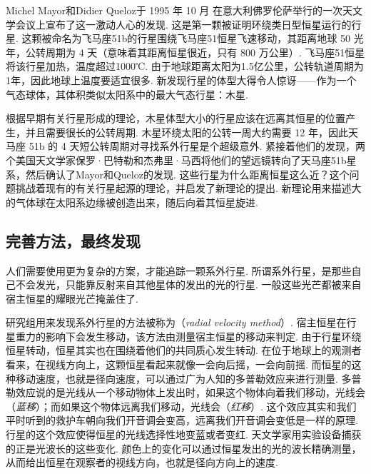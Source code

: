 \begin{multicols}{2}

Michel Mayor和Didier Queloz于 1995 年 10 月 在意大利佛罗伦萨举行的一次天文学会议上宣布了这一激动人心的发现. 这是第一颗被证明环绕类日型恒星运行的行星. 这颗被命名为飞马座51b的行星围绕飞马座51恒星飞速移动，其距离地球 50 光年，公转周期为 4 天（意味着其距离恒星很近，只有 800 万公里）. 飞马座51恒星将该行星加热，温度超过1000℃. 由于地球距离太阳为1.5亿公里，公转轨道周期为1年，因此地球上温度要适宜很多. 新发现行星的体型大得令人惊讶——作为一个气态球体，其体积类似太阳系中的最大气态行星：木星. 

根据早期有关行星形成的理论，木星体型大小的行星应该在远离其恒星的位置产生，并且需要很长的公转周期. 木星环绕太阳的公转一周大约需要 12 年，因此天马座 51b 的 4 天短公转周期对寻找系外行星是个超级意外. 紧接着他们的发现，两个美国天文学家保罗·巴特勒和杰弗里·马西将他们的望远镜转向了天马座51b星系，然后确认了Mayor和Queloz的发现. 这些行星为什么距离恒星这么近？这个问题挑战着现有的有关行星起源的理论，并启发了新理论的提出. 新理论用来描述大的气体球在太阳系边缘被创造出来，随后向着其恒星旋进. 

\subsection*{完善方法，最终发现}

人们需要使用更为复杂的方案，才能追踪一颗系外行星. 所谓系外行星，是那些自己不会发光，只能靠反射来自其他星体的发出的光的行星. 一般这些光芒都被来自宿主恒星的耀眼光芒掩盖住了. 

 研究组用来发现系外行星的方法被称为（\textit{radial velocity method}）. 宿主恒星在行星重力的影响下会发生移动，该方法由测量宿主恒星的移动来判定. 由于行星环绕恒星转动，恒星其实也在围绕着他们的共同质心发生转动. 在位于地球上的观测者看来，在视线方向上，这颗恒星看起来就像一会向后摇，一会向前摇. 而恒星的这种移动速度，也就是径向速度，可以通过广为人知的多普勒效应来进行测量. 多普勒效应说的是光线从一个移动物体上发出时，如果这个物体向着我们移动，光线会（\textit{蓝移}）；而如果这个物体远离我们移动，光线会（\textit{红移}）. 这个效应其实和我们平时听到的救护车朝向我们开音调会变高，远离我们开音调会变低是一样的原理. 行星的这个效应使得恒星的光线选择性地变蓝或者变红. 天文学家用实验设备捕获的正是光波长的这些变化. 颜色上的变化可以通过恒星发出的光的波长精确测量，从而给出恒星在观察者的视线方向，也就是径向方向上的速度.  
 

\end{multicols}
